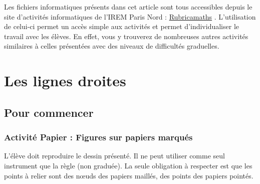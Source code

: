 Les fichiers informatiques présents dans cet article sont tous accessibles depuis le site d’activités informatiques de l’IREM Paris Nord : \href{http://www-irem.univ-paris13.fr/site_spip/spip.php?rubrique57}{Rubricamaths}
. L’utilisation de celui-ci permet un accès simple aux activités et permet d’individualiser le travail avec les élèves. En effet, vous y trouverez de nombreuses autres activités similaires à celles présentées avec des niveaux de difficultés graduelles.



\section{Les lignes droites}

\subsection{Pour commencer}

\subsubsection{Activité Papier : Figures sur papiers marqués}

L’élève doit reproduire le dessin présenté. Il ne peut utiliser comme seul instrument que la règle (non graduée). La seule obligation à respecter est que les points à relier sont des nœuds des papiers maillés, des points des papiers pointés.

